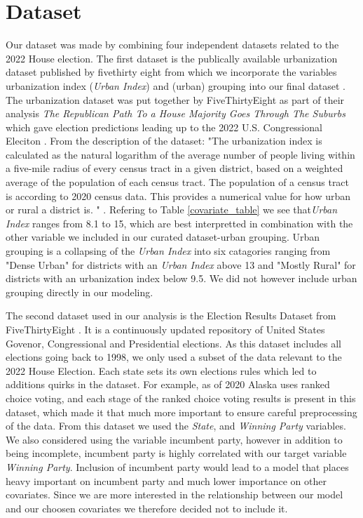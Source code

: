 \documentclass[12pt]{article}
\begin{document}
\section{Dataset}
Our dataset was made by combining four independent datasets related to the 2022 House election. The first dataset is the publically available urbanization dataset published by fivethirty eight from which we incorporate the variables urbanization index (\textit{Urban Index}) and (urban) grouping into our final dataset \cite{urbanizationdataset}. The urbanization dataset was put together by FiveThirtyEight as part of their analysis  \textit{The Republican Path To a House Majority Goes Through The Suburbs} which gave election predictions leading up to the 2022 U.S. Congressional Eleciton \cite{538urbanizationarticle}. From the description of the dataset: "The urbanization index is calculated as the natural logarithm of the average number of people living within a five-mile radius of every census tract in a given district, based on a weighted average of the population of each census tract. The population of a census tract is according to 2020 census data. This provides a numerical value for how urban or rural a district is. " \cite{urbanizationdataset}. Refering to Table \ref{covariate_table} we see that\textit{Urban Index} ranges from 8.1 to 15, which are best interpretted in combination with the other variable we included in our curated dataset-urban grouping. Urban grouping is a collapsing of the \textit{Urban Index} into six catagories ranging from "Dense Urban" for districts with an \textit{Urban Index} above 13 and "Mostly Rural" for districts with an urbanization index below 9.5. We did not however include urban grouping directly in our modeling.


The second dataset used in our analysis is the Election Results Dataset from FiveThirtyEight \cite{electionresultsdataset}. It is a continuously updated repository of United States Govenor, Congressional and Presidential elections. 
As this dataset includes all elections going back to 1998, we only used a subset of the data relevant to the 2022 House Election. Each state sets its own elections rules which led to additions quirks in the dataset. For example, as of 2020 Alaska uses ranked choice voting, and each stage of the ranked choice voting results is present in this dataset, which made it that much more important to ensure careful preprocessing of the data. From this dataset we used the \textit{State}, and \textit{Winning Party} variables. 
We also considered using the variable incumbent party, however in addition to being incomplete, incumbent party is highly correlated with our target variable \textit{Winning Party}. Inclusion of incumbent party would lead to a model that places heavy important on incumbent party and much lower importance on other covariates. Since we are more interested in the relationship between our model and our choosen covariates we therefore decided not to include it.  
 
\end{document}

